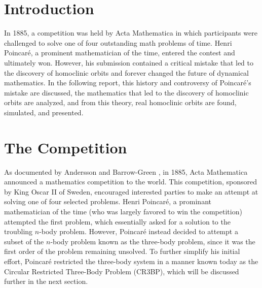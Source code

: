 \documentclass[11pt]{article} %
\title{\color{red}{We need a title, boi}}
\author{Luke Bury \& Don Kuettel}
\begin{document}
\maketitle
\section*{Introduction}
In 1885, a competition was held by Acta Mathematica in which participants were challenged to solve one of four outstanding math problems of time. Henri Poincaré, a prominent mathematician of the time, entered the contest and ultimately won. However, his submission contained a critical mistake that led to the discovery of homoclinic orbits and forever changed the future of dynamical mathematics. In the following report, this history and controversy of Poincaré's mistake are discussed, the mathematics that led to the discovery of homoclinic orbits are analyzed, and from this theory, real homoclinic orbits are found, simulated, and presented. 

\section*{The Competition}
As documented by Andersson and Barrow-Green \cite{Andersson1994,BarrowGreen1994}, in 1885, Acta Mathematica announced a mathematics competition to the world. This competition, sponsored by King Oscar II of Sweden, encouraged interested parties to make an attempt at solving one of four selected problems. Henri Poincaré, a prominant mathematician of the time (who was largely favored to win the competition) attempted the first problem, which essentially asked for a solution to the troubling $n$-body problem. However, Poincaré instead decided to attempt a subset of the $n$-body problem known as the three-body problem, since it was the first order of the problem remaining unsolved. To further simplify his initial effort, Poincaré restricted the three-body system in a manner known today as the Circular Restricted Three-Body Problem (CR3BP), which will be discussed further in the next section.
\end{document}
